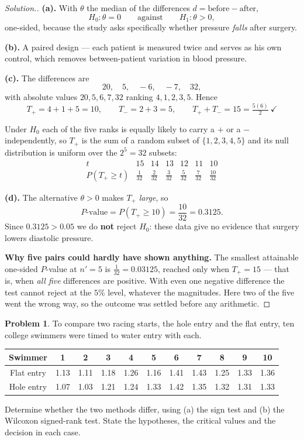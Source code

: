 \documentclass[11pt,a4paper]{article}
\theoremstyle{definition}
\newtheorem{problemx}{Problem}[section]
\newenvironment{problem}{\begin{problemx}}{\end{problemx}}
\newenvironment{solution}
  {\renewcommand{\qedsymbol}{}\begin{proof}[\textit{Solution}.]}
  {\end{proof}}
\begin{document}
\begin{solution}
\textbf{(a).} With $\theta$ the median of the differences
$d = \text{before} - \text{after}$,
$$H_0 : \theta = 0 \qquad\text{against}\qquad H_1 : \theta > 0 ,$$
one-sided, because the study asks specifically whether pressure \emph{falls} after
surgery.

\textbf{(b).} A paired design --- each patient is measured twice and serves as his
own control, which removes between-patient variation in blood pressure.

\textbf{(c).} The differences are
$$20,\quad 5,\quad -6,\quad -7,\quad 32 ,$$
with absolute values $20, 5, 6, 7, 32$ ranking $4, 1, 2, 3, 5$. Hence
$$T_{+} = 4 + 1 + 5 = 10,
\qquad
T_{-} = 2 + 3 = 5,
\qquad T_{+}+T_{-} = 15 = \tfrac{5(6)}{2}\ \checkmark$$

Under $H_0$ each of the five ranks is equally likely to carry a $+$ or a $-$
independently, so $T_{+}$ is the sum of a random subset of $\{1,2,3,4,5\}$ and its
null distribution is uniform over the $2^{5} = 32$ subsets:
$$\begin{array}{c|cccccc}
t & 15 & 14 & 13 & 12 & 11 & 10\\\hline
P(T_{+} \geq t) & \frac{1}{32} & \frac{2}{32} & \frac{3}{32} & \frac{5}{32}
& \frac{7}{32} & \frac{10}{32}
\end{array}$$

\textbf{(d).} The alternative $\theta > 0$ makes $T_{+}$ \emph{large}, so
$$P\text{-value} = P\left(T_{+} \geq 10\right) = \dfrac{10}{32} = 0.3125 .$$
Since $0.3125 > 0.05$ we do \textbf{not} reject $H_0$: these data give no evidence
that surgery lowers diastolic pressure.

\textbf{Why five pairs could hardly have shown anything.} The smallest attainable
one-sided $P$-value at $n' = 5$ is $\frac{1}{32} = 0.03125$, reached only when
$T_{+} = 15$ --- that is, when \emph{all five} differences are positive. With even
one negative difference the test cannot reject at the $5\%$ level, whatever the
magnitudes. Here two of the five went the wrong way, so the outcome was settled
before any arithmetic.
\end{solution}

\begin{problem}
To compare two racing starts, the hole entry and the flat entry, ten college
swimmers were timed to water entry with each.
\begin{center}
\begin{tabular}{|c|cccccccccc|}
\hline
Swimmer & 1 & 2 & 3 & 4 & 5 & 6 & 7 & 8 & 9 & 10\\
\hline
Flat entry & 1.13 & 1.11 & 1.18 & 1.26 & 1.16 & 1.41 & 1.43 & 1.25 & 1.33 & 1.36\\
Hole entry & 1.07 & 1.03 & 1.21 & 1.24 & 1.33 & 1.42 & 1.35 & 1.32 & 1.31 & 1.33\\
\hline
\end{tabular}
\end{center}
Determine whether the two methods differ, using (a) the sign test and (b) the
Wilcoxon signed-rank test. State the hypotheses, the critical values and the
decision in each case.
\end{problem}
\end{document}
